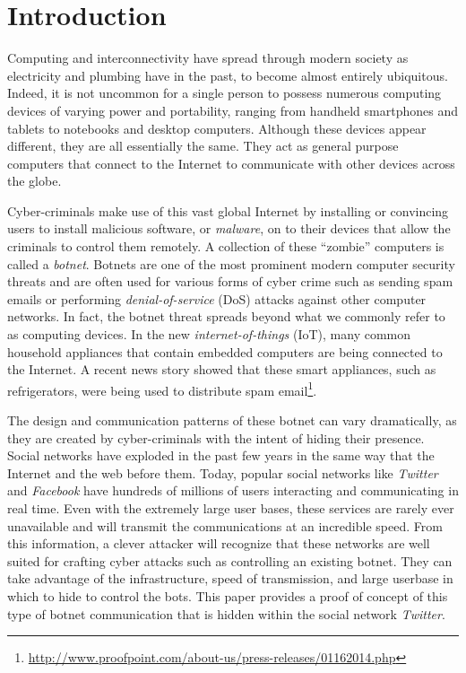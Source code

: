 \section{Introduction}
\label{cha:intro}

Computing and interconnectivity have spread through modern society as
electricity and plumbing have in the past, to become almost entirely ubiquitous.
Indeed, it is not uncommon for a single person to possess numerous computing
devices of varying power and portability, ranging from handheld smartphones and
tablets to notebooks and desktop computers.  Although these devices appear
different, they are all essentially the same.  They act as general purpose
computers that connect to the Internet to communicate with other devices across the
globe.

Cyber-criminals make use of this vast global Internet by installing or
convincing users to install malicious software, or \emph{malware}, on to their
devices that allow the criminals to control them remotely.  A collection of these
``zombie'' computers is called a \emph{botnet}.  Botnets are one of the
most prominent modern computer security threats \cite{botnet-taxonomy} and
are often used for various forms of cyber crime such as sending spam emails or
performing \emph{denial-of-service} (DoS) attacks against other computer
networks.  In fact, the botnet threat spreads beyond what we commonly refer to
as computing devices.  In the new \emph{internet-of-things} (IoT), many common household
appliances that contain embedded computers are being connected to the Internet.
A recent news story showed that these smart appliances, such as refrigerators,
were being used to distribute spam
email\footnote{\url{http://www.proofpoint.com/about-us/press-releases/01162014.php}}.

The design and communication patterns of these botnet can vary dramatically, as
they are created by cyber-criminals with the intent of hiding their presence.
Social networks have exploded in the past few years in the same way that the Internet
and the web before them.  Today, popular social networks like \emph{Twitter} and \emph{Facebook}
have hundreds of millions of users interacting and communicating in real time.
Even with the extremely large user bases, these services are rarely ever unavailable
and will transmit the communications at an incredible speed.  From this information,
a clever attacker will recognize that these networks are well suited for crafting
cyber attacks such as controlling an existing botnet.  They can take advantage of the
infrastructure, speed of transmission, and large userbase in which to hide to
control the bots.  This paper provides a proof of concept of this type of
botnet communication that is hidden within the social network \emph{Twitter}.

